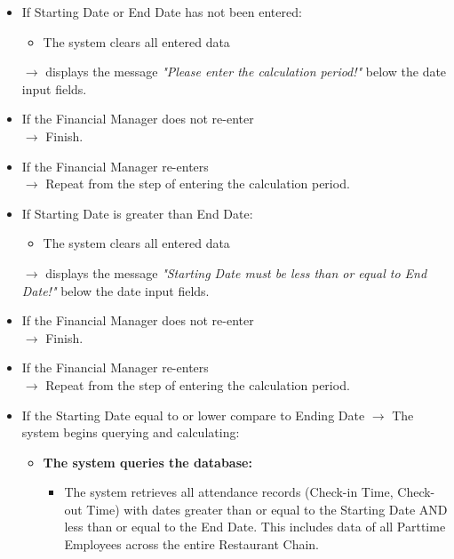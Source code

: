 \begin{itemize}
    \item If Starting Date or End Date has not been entered:
    \begin{itemize}
        \item The system clears all entered data
    \end{itemize}
    $\rightarrow$ displays the message \textit{"Please enter the calculation period!"} below the date input fields.

    \item If the Financial Manager does not re-enter\\
    $\rightarrow$ Finish.

    \item If the Financial Manager re-enters\\
    $\rightarrow$ Repeat from the step of entering the calculation period.

    \item If Starting Date is greater than End Date:
    \begin{itemize}
        \item The system clears all entered data
    \end{itemize}
    $\rightarrow$ displays the message \textit{"Starting Date must be less than or equal to End Date!"} below the date input fields.

    \item If the Financial Manager does not re-enter\\
    $\rightarrow$ Finish.

    \item If the Financial Manager re-enters\\
    $\rightarrow$ Repeat from the step of entering the calculation period.

    \item If the Starting Date equal to or lower compare to Ending Date $\rightarrow$ The system begins querying and calculating:
    \begin{itemize}
        \item \textbf{The system queries the database:}
        \begin{itemize}
            \item The system retrieves all attendance records (Check-in Time, Check-out Time) with dates greater than or equal to the Starting Date AND less than or equal to the End Date. This includes data of all Parttime Employees across the entire Restaurant Chain.
        \end{itemize}
        

\end{itemize}
\end{itemize}

